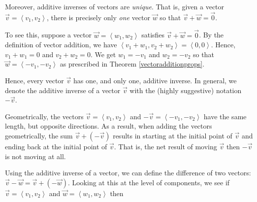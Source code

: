 \documentclass{ximera}
\begin{document}
Moreover, additive inverses of vectors are \textit{unique}.    That is, given a vector $\overrightarrow{v} = \left<v_1, v_2\right>$, there is precisely only \textit{one} vector $\overrightarrow{w}$ so that $\overrightarrow{v} + \overrightarrow{w} = \overrightarrow{0}$.

To see this, suppose a vector $\overrightarrow{w} = \left<w_1,w_2\right>$ satisfies  $\overrightarrow{v} + \overrightarrow{w} = \overrightarrow{0}$.  By the definition of vector addition, we have $\left<v_1 + w_1, v_2 + w_2\right> = \left<0,0\right>$.  Hence, $v_1 + w_1 = 0$ and $v_2 + w_2 = 0$.  We get $w_1 = -v_1$ and $w_2  = -v_2 $ so that $\overrightarrow{w} = \left<-v_1 , -v_2 \right>$ as prescribed in Theorem \ref{vectoradditionprops}.  

Hence, every vector $\overrightarrow{v}$ has one, and only one, additive inverse.  In general, we denote the additive inverse of a vector $\overrightarrow{v}$ with the (highly suggestive) notation $- \overrightarrow{v}$.

 Geometrically, the vectors $\overrightarrow{v} = \left<v_1, v_2\right>$ and $-\overrightarrow{v} = \left<-v_1, -v_2\right>$ have the same length, but opposite directions.  As a result, when adding the vectors geometrically, the sum $\overrightarrow{v} + (-\overrightarrow{v})$ results in starting at the initial point of $\overrightarrow{v}$ and ending back at the initial point of $\overrightarrow{v}$. That is,  the net result of moving $\overrightarrow{v}$ then $-\overrightarrow{v}$ is not moving at all.

\begin{center}
\end{center}

Using the additive inverse of a vector, we can define the difference of two vectors: $\overrightarrow{v} - \overrightarrow{w} = \overrightarrow{v} + (-\overrightarrow{w})$.  Looking at this at the level of components, we see if $\overrightarrow{v} = \left<v_1,v_2\right>$ and $\overrightarrow{w} = \left<w_1,w_2\right>$ then  
\end{document}
